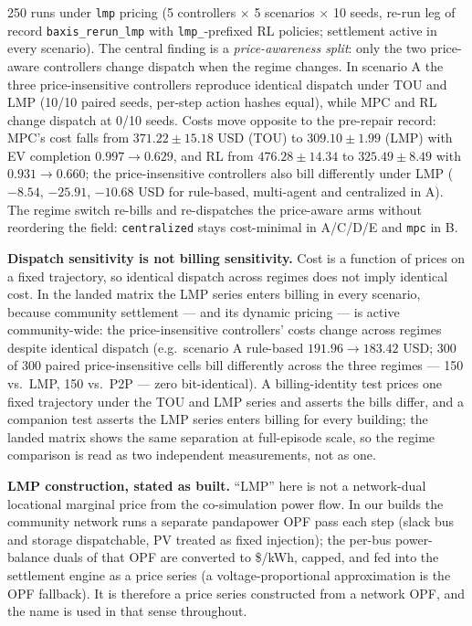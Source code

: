 \documentclass[11pt,a4paper]{article}
\newcommand{\agent}[1]{\texttt{#1}}
\begin{document}
250 runs under \texttt{lmp} pricing (5 controllers $\times$ 5 scenarios $\times$
10 seeds, re-run leg of record \texttt{baxis\_rerun\_lmp} with
\texttt{lmp\_}-prefixed RL policies; settlement active in every scenario). The
central finding is a \emph{price-awareness split}: only the two price-aware
controllers change dispatch when the regime changes. In scenario A the three
price-insensitive controllers reproduce identical dispatch under TOU and LMP
(10/10 paired seeds, per-step action hashes equal), while MPC and RL change
dispatch at 0/10 seeds. Costs move opposite to the pre-repair record: MPC's
cost falls from $371.22 \pm 15.18$ USD (TOU) to $309.10 \pm 1.99$ (LMP) with EV
completion $0.997 \to 0.629$, and RL from $476.28 \pm 14.34$ to
$325.49 \pm 8.49$ with $0.931 \to 0.660$; the price-insensitive controllers
also bill differently under LMP ($-8.54$, $-25.91$, $-10.68$ USD for
rule-based, multi-agent and centralized in A). The regime switch re-bills and
re-dispatches the price-aware arms without reordering the field:
\agent{centralized} stays cost-minimal in A/C/D/E and \agent{mpc} in B.

\textbf{Dispatch sensitivity is not billing sensitivity.} Cost is a function of
prices on a fixed trajectory, so identical dispatch across regimes does not
imply identical cost. In the landed matrix the LMP series enters billing in
every scenario, because community settlement --- and its dynamic pricing ---
is active community-wide: the price-insensitive controllers' costs change
across regimes despite identical dispatch (e.g.\ scenario A rule-based
$191.96 \to 183.42$ USD; 300 of 300 paired price-insensitive cells bill
differently across the three regimes --- 150 vs.\ LMP, 150 vs.\ P2P --- zero
bit-identical). A billing-identity test prices one fixed trajectory under the
TOU and LMP series and asserts the bills differ, and a companion test asserts
the LMP series enters billing for every building; the landed matrix shows the
same separation at full-episode scale, so the regime comparison is read as two
independent measurements, not as one.

\textbf{LMP construction, stated as built.} ``LMP'' here is not a network-dual
locational marginal price from the co-simulation power flow. In our builds the
community network runs a separate pandapower OPF pass each step (slack bus and
storage dispatchable, PV treated as fixed injection); the per-bus power-balance
duals of that OPF are converted to \$/kWh, capped, and fed into the settlement
engine as a price series (a voltage-proportional approximation is the OPF
fallback). It is therefore a price series constructed from a network OPF, and
the name is used in that sense throughout.
\end{document}
